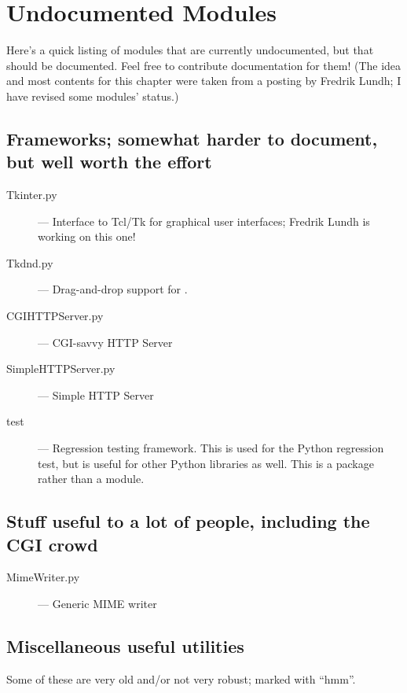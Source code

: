 \chapter{Undocumented Modules}
\label{undoc}

Here's a quick listing of modules that are currently undocumented, but
that should be documented.  Feel free to contribute documentation for
them!  (The idea and most contents for this chapter were taken from a
posting by Fredrik Lundh; I have revised some modules' status.)


\section{Frameworks; somewhat harder to document, but well worth the effort}

\begin{description}
\item[Tkinter.py]
--- Interface to Tcl/Tk for graphical user interfaces;
Fredrik Lundh is working on this one!

\item[Tkdnd.py]
--- Drag-and-drop support for .

\item[CGIHTTPServer.py]
--- CGI-savvy HTTP Server

\item[SimpleHTTPServer.py]
--- Simple HTTP Server

\item[test]
--- Regression testing framework.  This is used for the Python
regression test, but is useful for other Python libraries as well.
This is a package rather than a module.
\end{description}


\section{Stuff useful to a lot of people, including the CGI crowd}

\begin{description}
\item[MimeWriter.py]
--- Generic MIME writer
\end{description}


\section{Miscellaneous useful utilities}

Some of these are very old and/or not very robust; marked with ``hmm''.

